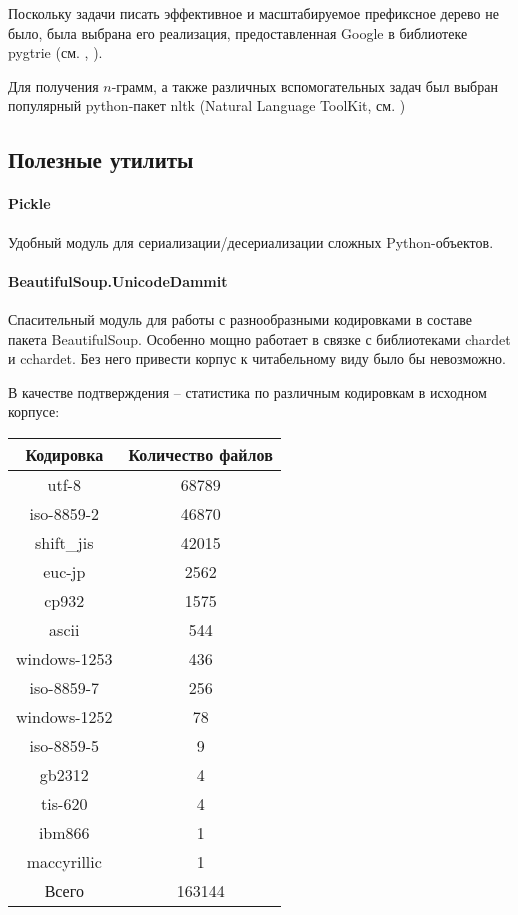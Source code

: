 Поскольку задачи писать эффективное и масштабируемое префиксное дерево не было, была выбрана его реализация, предоставленная Google в библиотеке pygtrie (см. \cite{python:pygtrie}, \cite{python:pygtrierepo}).

Для получения $n$-грамм, а также различных вспомогательных задач был выбран популярный python-пакет nltk (Natural Language ToolKit, см. \cite{python:nltk})

\subsection{ Полезные утилиты }

\paragraph{ Pickle } Удобный модуль для сериализации/десериализации сложных Python-объектов.

\paragraph{ BeautifulSoup.UnicodeDammit } Спасительный модуль для работы с разнообразными кодировками в составе пакета BeautifulSoup. Особенно мощно работает в связке с библиотеками chardet и cchardet. Без него привести корпус к читабельному виду было бы невозможно.

В качестве подтверждения -- статистика по различным кодировкам в исходном корпусе:

\begin{tabular}{c|c}
Кодировка & Количество файлов \\ \hline 
utf-8 & 68789\\ 
iso-8859-2 & 46870\\ 
shift\_jis & 42015\\ 
euc-jp & 2562\\ 
cp932 & 1575\\ 
ascii & 544\\ 
windows-1253 & 436\\ 
iso-8859-7 & 256\\ 
windows-1252 & 78\\ 
iso-8859-5 & 9\\ 
gb2312 & 4\\ 
tis-620 & 4\\ 
ibm866 & 1\\ 
maccyrillic & 1\\ \hline
Всего & 163144
\end{tabular}

